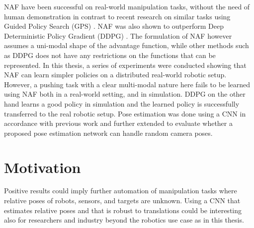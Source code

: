 NAF have been successful on real-world manipulation tasks, without the need of
human demonstration in contrast to recent research on similar tasks using
Guided Policy Search (GPS) \cite{yahya2016collective}. NAF was also shown to
outperform Deep Deterministic Policy Gradient (DDPG)
\cite{gu2016deep,lillicrap2015continuous}. The formulation of NAF however
assumes a uni-modal shape of the advantage function, while other methods such as
DDPG does not have any restrictions on the functions that can be represented.
In this thesis, a series of experiments were conducted showing that NAF can
learn simpler policies on a distributed real-world robotic setup. However, a
pushing task with a clear multi-modal nature here fails to be learned using NAF
both in a real-world setting, and in simulation. DDPG on the other hand learns
a good policy in simulation and the learned policy is successfully transferred
to the real robotic setup. Pose estimation was done using a CNN in accordance
with previous work \cite{levine2016end,chebotar2016path,yahya2016collective}
and further extended to evaluate whether a proposed pose estimation network can
handle random camera poses.

\section{Motivation}

Positive results could imply further automation of manipulation tasks where
relative poses of robots, sensors, and targets are unknown. Using a CNN that
estimates relative poses and that is robust to translations could be
interesting also for researchers and industry beyond the robotics use case as
in this thesis.
